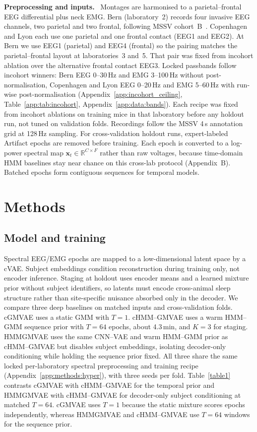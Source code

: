 \documentclass[10pt,letterpaper]{article}
\newcommand{\methodpara}[1]{\par\vspace{0.85em}\noindent\textbf{#1}\ }
\newcommand{\apdx}[1]{Appendix~\ref{#1}}
\newcommand{\papersection}[1]{\section{#1}}
\newcommand{\papersubsection}[1]{\subsection{#1}}
\newcommand{\papersection}[1]{\section*{#1}}
\newcommand{\papersubsection}[1]{\subsection*{#1}}
\begin{document}
\methodpara{Preprocessing and inputs.}
Montages are harmonised to a parietal--frontal EEG differential plus neck EMG.
Bern (laboratory~2) records four invasive EEG channels, two parietal and two frontal, following MSSV cohort~B~\cite{rose2025mssv}.
Copenhagen and Lyon each use one parietal and one frontal contact (EEG1 and EEG2).
At Bern we use EEG1 (parietal) and EEG4 (frontal) so the pairing matches the parietal--frontal layout at laboratories~3 and~5.
That pair was fixed from incohort ablation over the alternative frontal contact EEG3.
Locked passbands follow incohort winners: Bern EEG 0--30\,Hz and EMG 3--100\,Hz without post-normalisation, Copenhagen and Lyon EEG 0--20\,Hz and EMG 5--60\,Hz with run-wise post-normalisation (\apdx{app:incohort_ceiling}, Table~\ref{app:tab:incohort}, \apdx{app:data:bands}).
Each recipe was fixed from incohort ablations on training mice in that laboratory before any holdout run, not tuned on validation folds.
Recordings follow the MSSV 4\,s annotation grid at 128\,Hz sampling.
For cross-validation holdout runs, expert-labeled Artifact epochs are removed before training.
Each epoch is converted to a log-power spectral map $\mathbf{x}_t \in \mathbb{R}^{C \times F}$ rather than raw voltages, because time-domain HMM baselines stay near chance on this cross-lab protocol (Appendix~B).
Batched epochs form contiguous sequences for temporal models.

\papersection{Methods}
\label{sec:methods}

\papersubsection{Model and training}

Spectral EEG/EMG epochs are mapped to a low-dimensional latent space by a cVAE.
Subject embeddings condition reconstruction during training only, not encoder inference.
Staging at holdout uses encoder means and a learned mixture prior without subject identifiers, so latents must encode cross-animal sleep structure rather than site-specific nuisance absorbed only in the decoder.
We compare three deep baselines on matched inputs and cross-validation folds.
cGMVAE uses a static GMM with $T{=}1$.
cHMM--GMVAE uses a warm HMM--GMM sequence prior with $T{=}64$ epochs, about 4.3\,min, and $K{=}3$ for staging.
HMMGMVAE uses the same CNN--VAE and warm HMM--GMM prior as cHMM--GMVAE but disables subject embeddings, isolating decoder-only conditioning while holding the sequence prior fixed.
All three share the same locked per-laboratory spectral preprocessing and training recipe (\apdx{app:methods:hyper}), with three seeds per fold.
Table~\ref{table1} contrasts cGMVAE with cHMM--GMVAE for the temporal prior and HMMGMVAE with cHMM--GMVAE for decoder-only subject conditioning at matched $T{=}64$.
cGMVAE uses $T{=}1$ because the static mixture scores epochs independently, whereas HMMGMVAE and cHMM--GMVAE use $T{=}64$ windows for the sequence prior.
\end{document}
